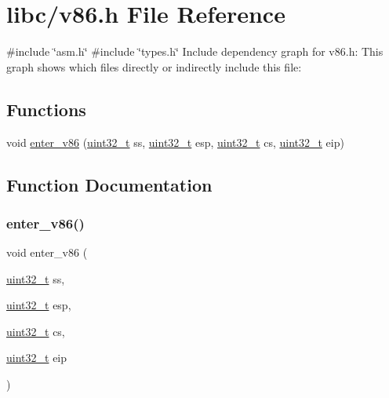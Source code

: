\hypertarget{a00041}{}\section{libc/v86.h File Reference}
\label{a00041}
{\ttfamily \#include \char`\"{}asm.\+h\char`\"{}}\newline
{\ttfamily \#include \char`\"{}types.\+h\char`\"{}}\newline
Include dependency graph for v86.\+h\+:
This graph shows which files directly or indirectly include this file\+:
\subsection*{Functions}
\begin{DoxyCompactItemize}
\item 
void \hyperlink{a00041_a9c262613816b82529fff89eda722abaf_a9c262613816b82529fff89eda722abaf}{enter\+\_\+v86} (\hyperlink{a00038_a435d1572bf3f880d55459d9805097f62_a435d1572bf3f880d55459d9805097f62}{uint32\+\_\+t} ss, \hyperlink{a00038_a435d1572bf3f880d55459d9805097f62_a435d1572bf3f880d55459d9805097f62}{uint32\+\_\+t} esp, \hyperlink{a00038_a435d1572bf3f880d55459d9805097f62_a435d1572bf3f880d55459d9805097f62}{uint32\+\_\+t} cs, \hyperlink{a00038_a435d1572bf3f880d55459d9805097f62_a435d1572bf3f880d55459d9805097f62}{uint32\+\_\+t} eip)
\end{DoxyCompactItemize}


\subsection{Function Documentation}
\mbox{\label{a00041_a9c262613816b82529fff89eda722abaf_a9c262613816b82529fff89eda722abaf}} 
\subsubsection{\texorpdfstring{enter\+\_\+v86()}{enter\_v86()}}
{\footnotesize\ttfamily void enter\+\_\+v86 (\begin{DoxyParamCaption}\item[{\hyperlink{a00038_a435d1572bf3f880d55459d9805097f62_a435d1572bf3f880d55459d9805097f62}{uint32\+\_\+t}}]{ss,  }\item[{\hyperlink{a00038_a435d1572bf3f880d55459d9805097f62_a435d1572bf3f880d55459d9805097f62}{uint32\+\_\+t}}]{esp,  }\item[{\hyperlink{a00038_a435d1572bf3f880d55459d9805097f62_a435d1572bf3f880d55459d9805097f62}{uint32\+\_\+t}}]{cs,  }\item[{\hyperlink{a00038_a435d1572bf3f880d55459d9805097f62_a435d1572bf3f880d55459d9805097f62}{uint32\+\_\+t}}]{eip }\end{DoxyParamCaption})}

